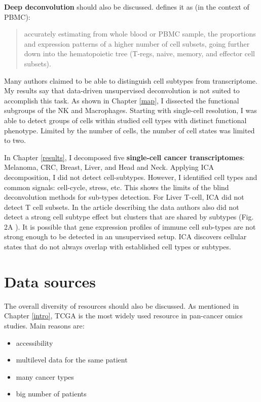 \documentclass[12pt,]{book}
\providecommand{\tightlist}{%
  \setlength{\itemsep}{0pt}\setlength{\parskip}{0pt}}
\theoremstyle{definition}
\theoremstyle{definition}
\theoremstyle{definition}
\theoremstyle{remark}
\begin{document}
\textbf{Deep deconvolution } should also be discussed.
\citet{Shen-Orr2013} defines it as (in the context of PBMC):

\begin{quote}
accurately estimating from whole blood or PBMC sample, the proportions
and expression patterns of a higher number of cell subsets, going
further down into the hematopoietic tree (T-regs, naive, memory, and
effector cell subsets).
\end{quote}

Many authors \citep{Newman2015, He2018, Aran2017} claimed to be able to
distinguish cell subtypes from transcriptome. My results say that
data-driven unsupervised deconvolution is not suited to accomplish this
task. As shown in Chapter \ref{map}, I dissected the functional
subgroups of the NK and Macrophages. Starting with single-cell
resolution, I was able to detect groups of cells within studied cell
types with distinct functional phenotype. Limited by the number of
cells, the number of cell states was limited to two.

In Chapter \ref{results}, I decomposed five \textbf{single-cell cancer
transcriptomes}: Melanoma, CRC, Breast, Liver, and Head and Neck.
Applying ICA decomposition, I did not detect cell-subtypes. However, I
identified cell types and common signals: cell-cycle, stress, etc. This
shows the limits of the blind deconvolution methods for sub-types
detection. For Liver T-cell, ICA did not detect T cell subsets. In the
article describing the data \citep{Zheng2017} authors also did not
detect a strong cell subtype effect but clusters that are shared by
subtypes (Fig. 2A \citep{Zheng2017}). It is possible that gene
expression profiles of immune cell sub-types are not strong enough to be
detected in an unsupervised setup. ICA discovers cellular states that do
not always overlap with established cell types or subtypes.

\hypertarget{data-sources-1}{%
\section{Data sources}\label{data-sources-1}}

The overall diversity of resources should also be discussed. As
mentioned in Chapter \ref{intro}, TCGA is the most widely used resource
in pan-cancer omics studies. Main reasons are:

\begin{itemize}
\tightlist
\item
  accessibility
\item
  multilevel data for the same patient
\item
  many cancer types
\item
  big number of patients
\end{itemize}
\end{document}
